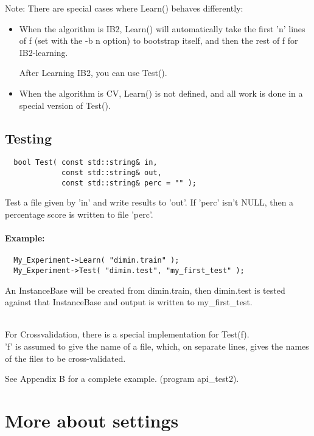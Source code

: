 Note: There are special cases where Learn() behaves differently:

\begin{itemize}
\item When the algorithm is IB2, Learn() will automatically take the
first 'n' lines of f (set with the -b n option) to bootstrap itself,
and then the rest of f for IB2-learning. 

After Learning IB2, you can use Test().

\item When the algorithm is CV, Learn() is not defined, and all work
is done in a special version of Test().
\end{itemize}

\subsection{Testing}
\begin{verbatim}
  bool Test( const std::string& in,
             const std::string& out,
             const std::string& perc = "" );
\end{verbatim}

Test a file given by 'in' and write results to 'out'. If 'perc' isn't
NULL, then a percentage score is written to file 'perc'.

\paragraph{Example:}
\begin{verbatim}
  My_Experiment->Learn( "dimin.train" );  
  My_Experiment->Test( "dimin.test", "my_first_test" );  
\end{verbatim}

An InstanceBase will be created from dimin.train, then dimin.test is
tested against that InstanceBase and output is written to
my\_first\_test.

\ \\
For Crossvalidation, there is a special implementation for Test(f).\\
'f' is assumed to give the name of a file, which, on separate lines,
gives the names of the files to be cross-validated. 

See Appendix B for a complete example. (program api\_test2).

\section{More about settings}

